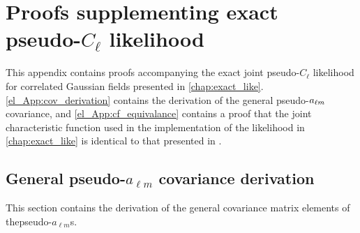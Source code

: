 
\chapter{Proofs supplementing exact pseudo-\texorpdfstring{$C_\ell$}{Cl} likelihood}

This appendix contains proofs accompanying the exact joint pseudo-$C_\ell$ likelihood for correlated Gaussian fields presented in \autoref{chap:exact_like}. \autoref{el_App:cov_derivation} contains the derivation of the general pseudo-$a_{\ell m}$ covariance, and \autoref{el_App:cf_equivalance} contains a proof that the joint characteristic function used in the implementation of the likelihood in \autoref{chap:exact_like} is identical to that presented in \citet{Good1963}.

\section{General pseudo-\texorpdfstring{$a_{\ell m}$}{alm} covariance derivation}
\label{el_App:cov_derivation}

This section contains the derivation of
the general covariance matrix elements of the\linebreak pseudo-$a_{\ell m}$s.

